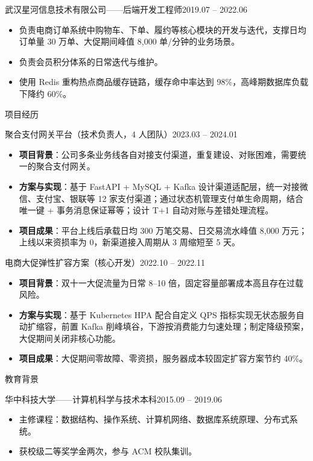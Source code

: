 \documentclass[10.5pt,fontset=windows]{ctexart}
\newcommand{\rsection}[1]{%
  \vspace{9pt}%
  {\color{maincolor}\heiti\zihao{4}#1}\par
  \vspace{1pt}{\color{maincolor}\rule{\textwidth}{1pt}}\par
  \vspace{3pt}}
\newcommand{\entryhead}[2]{%
  {\heiti #1}\hfill{\color{graytext}\small #2}\par\vspace{1pt}}
\newcommand{\subhead}[2]{%
  {\heiti #1}\hfill{\color{graytext}\small #2}\par\vspace{1pt}}
\begin{document}
\entryhead{武汉星河信息技术有限公司\quad ——\quad 后端开发工程师}{2019.07 -- 2022.06}
\begin{itemize}
  \item 负责电商订单系统中购物车、下单、履约等核心模块的开发与迭代，支撑日均订单量 30 万单、大促期间峰值 8,000 单/分钟的业务场景。
  \item 负责会员积分体系的日常迭代与维护。
  \item 使用 Redis 重构热点商品缓存链路，缓存命中率达到 98\%，高峰期数据库负载下降约 60\%。
\end{itemize}

\rsection{项目经历}

\entryhead{聚合支付网关平台（技术负责人，4 人团队）}{2023.03 -- 2024.01}
\begin{itemize}
  \item \textbf{项目背景}：公司多条业务线各自对接支付渠道，重复建设、对账困难，需要统一的聚合支付网关。
  \item \textbf{方案与实现}：基于 FastAPI + MySQL + Kafka 设计渠道适配层，统一对接微信、支付宝、银联等 12 家支付渠道；通过状态机管理支付单生命周期，结合唯一键 + 事务消息保证幂等；设计 T+1 自动对账与差错处理流程。
  \item \textbf{项目成果}：平台上线后承载日均 300 万笔交易、日交易流水峰值 8,000 万元；上线以来资损率为 0，新渠道接入周期从 3 周缩短至 5 天。
\end{itemize}

\entryhead{电商大促弹性扩容方案（核心开发）}{2022.10 -- 2022.11}
\begin{itemize}
  \item \textbf{项目背景}：双十一大促流量为日常 8--10 倍，固定容量部署成本高且存在过载风险。
  \item \textbf{方案与实现}：基于 Kubernetes HPA 配合自定义 QPS 指标实现无状态服务自动扩缩容，前置 Kafka 削峰填谷，下游按消费能力匀速处理；制定降级预案，大促期间关闭非核心功能。
  \item \textbf{项目成果}：大促期间零故障、零资损，服务器成本较固定扩容方案节约 40\%。
\end{itemize}

\rsection{教育背景}
\subhead{华中科技大学\quad ——\quad 计算机科学与技术\quad 本科}{2015.09 -- 2019.06}
\begin{itemize}
  \item 主修课程：数据结构、操作系统、计算机网络、数据库系统原理、分布式系统。
  \item 获校级二等奖学金两次，参与 ACM 校队集训。
\end{itemize}
\end{document}
